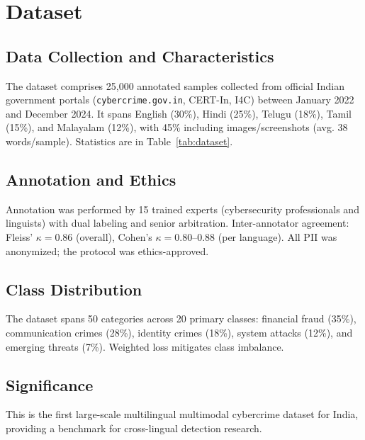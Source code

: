 \section{Dataset}

\subsection{Data Collection and Characteristics}
The dataset comprises 25,000 annotated samples collected from official Indian government
portals (\texttt{cybercrime.gov.in}, CERT-In, I4C) between January 2022 and December 2024.
It spans English (30\%), Hindi (25\%), Telugu (18\%), Tamil (15\%), and Malayalam (12\%),
with 45\% including images/screenshots (avg. 38 words/sample). Statistics are in
Table~\ref{tab:dataset}.

\subsection{Annotation and Ethics}
Annotation was performed by 15 trained experts (cybersecurity professionals and linguists)
with dual labeling and senior arbitration. Inter-annotator agreement: Fleiss' $\kappa = 0.86$
(overall), Cohen's $\kappa = 0.80$--$0.88$ (per language). All PII was anonymized; the
protocol was ethics-approved.

\subsection{Class Distribution}
The dataset spans 50 categories across 20 primary classes: financial fraud (35\%),
communication crimes (28\%), identity crimes (18\%), system attacks (12\%), and emerging
threats (7\%). Weighted loss mitigates class imbalance.

\subsection{Significance}
This is the first large-scale multilingual multimodal cybercrime dataset for India,
providing a benchmark for cross-lingual detection research.